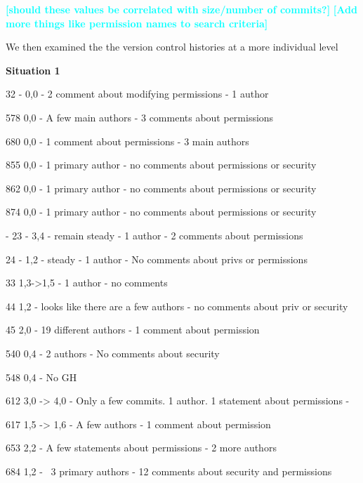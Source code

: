 \documentclass[conference]{IEEEtran}
\newcommand{\todo}[1]{\textcolor{cyan}{\textbf{[#1]}}}
\begin{document}
\todo{should these values be correlated with size/number of commits?}
\todo{Add more things like permission names to search criteria}




We then examined the the version control histories at a more individual level %






 \textbf{Situation 1} 




32 - 0,0
- 2 comment about modifying permissions
- 1 author


578 0,0
- A few main authors
- 3 comments about permissions


680 0,0
- 1 comment about permissions 
- 3 main authors


855 0,0
- 1 primary author
- no comments about permissions or security

862 0,0
- 1 primary author
- no comments about permissions or security

874 0,0
- 1 primary author
- no comments about permissions or security


- 23 - 3,4 - remain steady
-	1 author
-	2 comments about permissions


24 - 1,2 - steady
- 1 author
- No comments about privs or permissions


33 1,3->1,5
- 1 author
- no comments

44 1,2
- looks like there are a few authors
- no comments about priv or security


45 2,0
- 19 different authors
- 1 comment about permission


540 0,4
- 2 authors
- No comments about security


548 0,4
- No GH


612 3,0 -> 4,0
- Only a few commits. 1 author. 1 statement about permissions
- 


617 1,5 -> 1,6
- A few authors
- 1 comment about permission


653 2,2
- A few statements about permissions
- 2 more authors


684 1,2
- ~3 primary authors
- 12 comments about security and permissions
\end{document}
